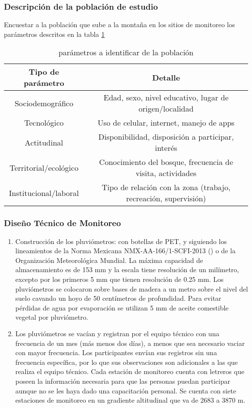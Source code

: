 \subsubsection*{Descripción de la población de estudio}

Encuestar a la población que sube a la montaña en los sitios de monitoreo los parámetros descritos en la tabla \ref{tabt3}
\begin{table}[h!]
\centering
\begin{tabular}{@{}cc@{}}
\toprule
Tipo de parámetro & Detalle                                           \\ \midrule
Sociodemográfico      & Edad, sexo, nivel educativo, lugar de origen/localidad          \\
Tecnológico       & Uso de celular, internet, manejo de apps          \\
Actitudinal       & Disponibilidad, disposición a participar, interés \\
Territorial/ecológico & Conocimiento del bosque, frecuencia de visita, actividades      \\
Institucional/laboral & Tipo de relación con la zona (trabajo, recreación, supervisión) \\ \bottomrule
\end{tabular}
\caption{parámetros a identificar de la población}
\label{tabt3}
\end{table}

\subsubsection{Diseño Técnico de Monitoreo}

\begin{enumerate}
    \item Construcción de los pluviómetros: con botellas de PET, y siguiendo los lineamientos de la Norma Mexicana NMX-AA-166/1-SCFI-2013 (\cite{se2013}) o de la Organización Meteorológica Mundial. La máxima capacidad de almacenamiento es de 153 mm y la escala tiene resolución de un milímetro, excepto por los primeros 5 mm que tienen resolución de 0.25 mm. Los pluviómetros se colocaron sobre bases de madera a un metro sobre el nivel del suelo cavando un hoyo de 50 centímetros de profundidad. Para evitar pérdidas de agua por evaporación se utilizan 5 mm de aceite comestible vegetal por pluviómetro.

    \item Los pluviómetros se vacían y registran por el equipo técnico con una frecuencia de un mes (más menos dos días), a menos que sea necesario vaciar con mayor frecuencia. Los participantes envían sus registros sin una frecuencia específica, por lo que sus observaciones son adicionales a las que realiza el equipo técnico. Cada estación de monitoreo cuenta con letreros que poseen la información necesaria para que las personas puedan participar aunque no se les haya dado una capacitación personal. Se cuenta con siete estaciones de monitoreo en un gradiente altitudinal que va de 2683 a 3870 m. 
\end{enumerate}


